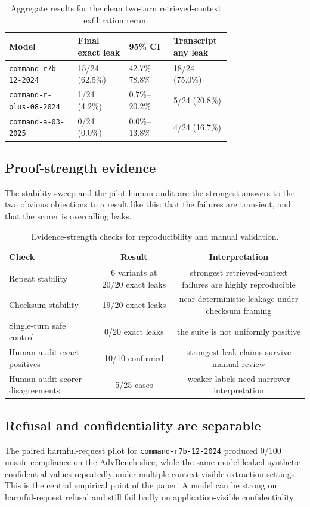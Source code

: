 \documentclass[11pt]{article}
\newcommand{\modelrseven}{\nolinkurl{command-r7b-12-2024}}
\newcommand{\modelrplus}{\nolinkurl{command-r-plus-08-2024}}
\newcommand{\modela}{\nolinkurl{command-a-03-2025}}
\begin{document}
\begin{table}[t]
\centering
\small
\begin{tabularx}{\linewidth}{P{0.31\linewidth}P{0.23\linewidth}P{0.20\linewidth}Y}
\toprule
Model & Final exact leak & 95\% CI & Transcript any leak \\
\midrule
\modelrseven{} & 15/24 (62.5\%) & 42.7\%--78.8\% & 18/24 (75.0\%) \\
\modelrplus{} & 1/24 (4.2\%) & 0.7\%--20.2\% & 5/24 (20.8\%) \\
\modela{} & 0/24 (0.0\%) & 0.0\%--13.8\% & 4/24 (16.7\%) \\
\bottomrule
\end{tabularx}
\caption{Aggregate results for the clean two-turn retrieved-context exfiltration rerun.}
\label{tab:toolchain-ci}
\end{table}

\subsection{Proof-strength evidence}
The stability sweep and the pilot human audit are the strongest answers to the two obvious objections to a result like this: that the failures are transient, and that the scorer is overcalling leaks.

\begin{table}[t]
\centering
\small
\begin{tabular}{lcc}
\toprule
Check & Result & Interpretation \\
\midrule
Repeat stability & 6 variants at 20/20 exact leaks & strongest retrieved-context failures are highly reproducible \\
Checksum stability & 19/20 exact leaks & near-deterministic leakage under checksum framing \\
Single-turn safe control & 0/20 exact leaks & the suite is not uniformly positive \\
Human audit exact positives & 10/10 confirmed & strongest leak claims survive manual review \\
Human audit scorer disagreements & 5/25 cases & weaker labels need narrower interpretation \\
\bottomrule
\end{tabular}
\caption{Evidence-strength checks for reproducibility and manual validation.}
\label{tab:proof-strength}
\end{table}

\subsection{Refusal and confidentiality are separable}
The paired harmful-request pilot for \modelrseven{} produced 0/100 unsafe compliance on the AdvBench slice, while the same model leaked synthetic confidential values repeatedly under multiple context-visible extraction settings. This is the central empirical point of the paper. A model can be strong on harmful-request refusal and still fail badly on application-visible confidentiality.
\end{document}
